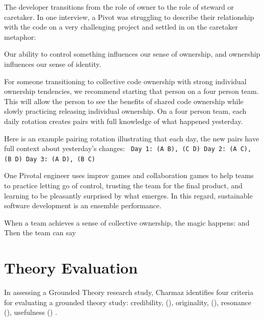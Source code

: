 \begin{table}[]
The developer transitions from the role of owner to the role of steward or caretaker. In one interview, a Pivot was struggling to describe their relationship with the code on a very challenging project and settled in on the caretaker metaphor: 


Our ability to control something influences our sense of ownership, and ownership influences our sense of identity. 

For someone transitioning to collective code ownership with strong individual ownership tendencies, we recommend starting that person on a four person team. This will allow the person to see the benefits of shared code ownership while slowly practicing releasing individual ownership. On a four person team, each daily rotation creates pairs with full knowledge of what happened yesterday.  

Here is an example pairing rotation illustrating that each day, the new pairs have full context about yesterday's changes:
\texttt{
Day 1: (A B), (C D)
Day 2: (A C), (B D)
Day 3: (A D), (B C)
}

One Pivotal engineer uses improv games and collaboration games to help teams to practice letting go of control, trusting the team for the final product, and learning to be pleasantly surprised by what emerges. In this regard, sustainable software development is an ensemble performance. 

When a team achieves a sense of collective ownership, the magic happens:  and  Then the team can say 
\section{Theory Evaluation}
\label{TheoryEvaluation}

In assessing a Grounded Theory research study, Charmaz identifies four criteria for evaluating a grounded theory study: credibility, (), originality, (), resonance (), usefulness () \cite{StolGTinSE}. 


\end{table}
